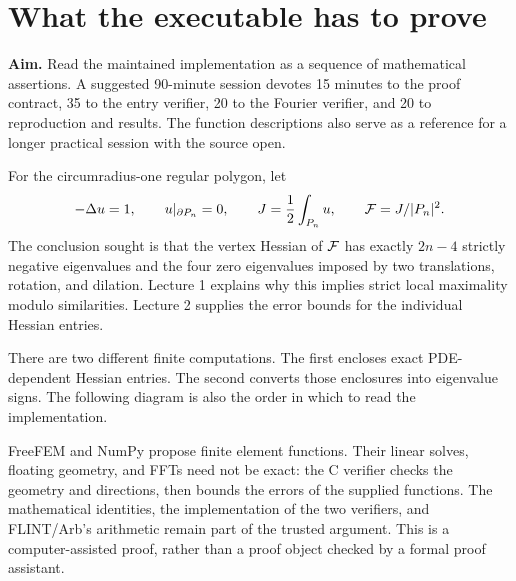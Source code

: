\section{What the executable has to prove}
\label{l3:contract}
\noindent\textbf{Aim.} Read the maintained implementation as a sequence of
mathematical assertions. A suggested 90-minute session devotes 15 minutes
to the proof contract, 35 to the entry verifier, 20 to the Fourier verifier,
and 20 to reproduction and results. The function descriptions also serve
as a reference for a longer practical session with the source open.

For the circumradius-one regular polygon, let
\[
 -\Delta u=1,\qquad u|_{\partial P_n}=0,\qquad
 J=\frac12\int_{P_n}u,\qquad \mathcal F=J/|P_n|^2.
\]
The conclusion sought is that the vertex Hessian of $\mathcal F$ has exactly
$2n-4$ strictly negative eigenvalues and the four zero eigenvalues imposed
by two translations, rotation, and dilation. Lecture 1 explains why this
implies strict local maximality modulo similarities. Lecture 2 supplies
the error bounds for the individual Hessian entries.

There are two different finite computations. The first encloses exact
PDE-dependent Hessian entries. The second converts those enclosures into
eigenvalue signs. The following diagram is also the order in which to read
the implementation.
\begin{center}
\end{center}

FreeFEM and NumPy propose finite element functions. Their linear solves,
floating geometry, and FFTs need not be exact: the C verifier checks the
geometry and directions, then bounds the errors of the supplied functions.
The mathematical identities, the implementation of the two verifiers, and
FLINT/Arb's arithmetic remain part of the trusted argument. This is a
computer-assisted proof, rather than a proof object checked by a formal
proof assistant.


